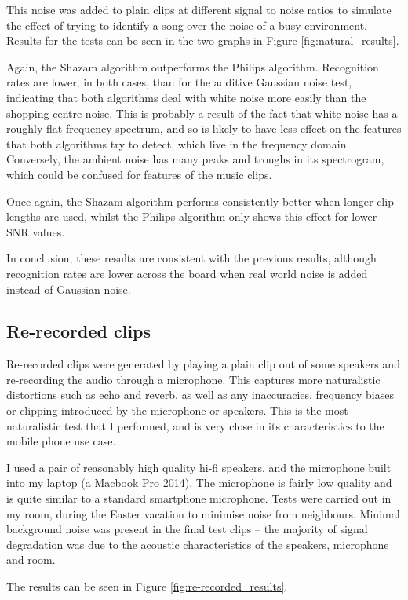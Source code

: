 \documentclass[12pt,a4paper,twoside,openright]{report}
\begin{document}
This noise was added to plain clips at different signal to noise ratios to simulate the effect of trying to identify a song over the noise of a busy environment. Results for the tests can be seen in the two graphs in Figure \ref{fig:natural_results}.

Again, the Shazam algorithm outperforms the Philips algorithm. Recognition rates are lower, in both cases, than for the additive Gaussian noise test, indicating that both algorithms deal with white noise more easily than the shopping centre noise. This is probably a result of the fact that white noise has a roughly flat frequency spectrum, and so is likely to have less effect on the features that both algorithms try to detect, which live in the frequency domain. Conversely, the ambient noise has many peaks and troughs in its spectrogram, which could be confused for features of the music clips.

Once again, the Shazam algorithm performs consistently better when longer clip lengths are used, whilst the Philips algorithm only shows this effect for lower SNR values.

In conclusion, these results are consistent with the previous results, although recognition rates are lower across the board when real world noise is added instead of Gaussian noise.


\subsection{Re-recorded clips}

Re-recorded clips were generated by playing a plain clip out of some speakers and re-recording the audio through a microphone. This captures more naturalistic distortions such as echo and reverb, as well as any inaccuracies, frequency biases or clipping introduced by the microphone or speakers. This is the most naturalistic test that I performed, and is very close in its characteristics to the mobile phone use case.

I used a pair of reasonably high quality hi-fi speakers, and the microphone built into my laptop (a Macbook Pro 2014). The microphone is fairly low quality and is quite similar to a standard smartphone microphone. Tests were carried out in my room, during the Easter vacation to minimise noise from neighbours. Minimal background noise was present in the final test clips -- the majority of signal degradation was due to the acoustic characteristics of the speakers, microphone and room.

The results can be seen in Figure \ref{fig:re-recorded_results}. 
\end{document}
